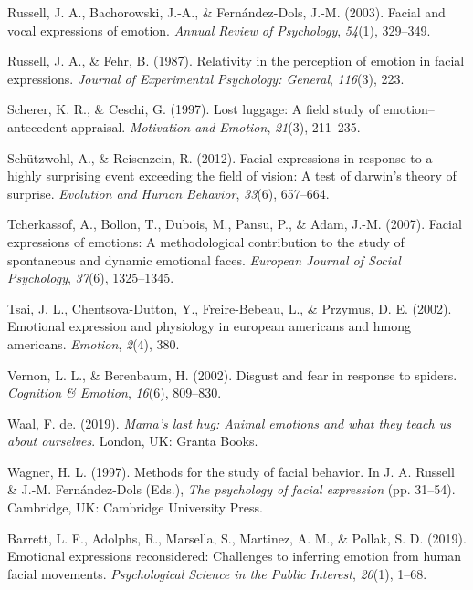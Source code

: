\documentclass[man]{apa6}
\begin{document}
\leavevmode\hypertarget{ref-russell2003facial}{}%
Russell, J. A., Bachorowski, J.-A., \& Fernández-Dols, J.-M. (2003). Facial and vocal expressions of emotion. \emph{Annual Review of Psychology}, \emph{54}(1), 329--349.

\leavevmode\hypertarget{ref-russell1987relativity}{}%
Russell, J. A., \& Fehr, B. (1987). Relativity in the perception of emotion in facial expressions. \emph{Journal of Experimental Psychology: General}, \emph{116}(3), 223.

\leavevmode\hypertarget{ref-scherer1997lost}{}%
Scherer, K. R., \& Ceschi, G. (1997). Lost luggage: A field study of emotion--antecedent appraisal. \emph{Motivation and Emotion}, \emph{21}(3), 211--235.

\leavevmode\hypertarget{ref-schutzwohl2012facial}{}%
Schützwohl, A., \& Reisenzein, R. (2012). Facial expressions in response to a highly surprising event exceeding the field of vision: A test of darwin's theory of surprise. \emph{Evolution and Human Behavior}, \emph{33}(6), 657--664.

\leavevmode\hypertarget{ref-tcherkassof2007facial}{}%
Tcherkassof, A., Bollon, T., Dubois, M., Pansu, P., \& Adam, J.-M. (2007). Facial expressions of emotions: A methodological contribution to the study of spontaneous and dynamic emotional faces. \emph{European Journal of Social Psychology}, \emph{37}(6), 1325--1345.

\leavevmode\hypertarget{ref-tsai2002emotional}{}%
Tsai, J. L., Chentsova-Dutton, Y., Freire-Bebeau, L., \& Przymus, D. E. (2002). Emotional expression and physiology in european americans and hmong americans. \emph{Emotion}, \emph{2}(4), 380.

\leavevmode\hypertarget{ref-vernon2002disgust}{}%
Vernon, L. L., \& Berenbaum, H. (2002). Disgust and fear in response to spiders. \emph{Cognition \& Emotion}, \emph{16}(6), 809--830.

\leavevmode\hypertarget{ref-de2019mama}{}%
Waal, F. de. (2019). \emph{Mama's last hug: Animal emotions and what they teach us about ourselves}. London, UK: Granta Books.

\leavevmode\hypertarget{ref-wagner1997methods}{}%
Wagner, H. L. (1997). Methods for the study of facial behavior. In J. A. Russell \& J.-M. Fernández-Dols (Eds.), \emph{The psychology of facial expression} (pp. 31--54). Cambridge, UK: Cambridge University Press.

\leavevmode\hypertarget{ref-barrett2019emotional}{}%
Barrett, L. F., Adolphs, R., Marsella, S., Martinez, A. M., \& Pollak, S. D. (2019). Emotional expressions reconsidered: Challenges to inferring emotion from human facial movements. \emph{Psychological Science in the Public Interest}, \emph{20}(1), 1--68.
\end{document}
